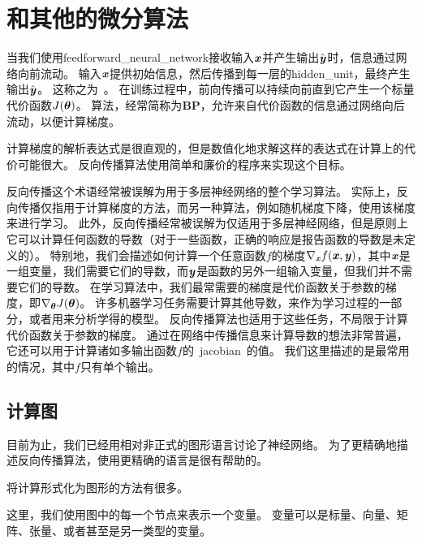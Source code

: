 
\section{和其他的微分算法}
\label{sec:back_propagation_and_other_differentiation_algorithms}

当我们使用\gls{feedforward_neural_network}接收输入$\boldsymbol{\mathit{x}}$并产生输出$\hat{\boldsymbol{\mathit{y}}}$时，信息通过网络向前流动。
输入$\boldsymbol{\mathit{x}}$提供初始信息，然后传播到每一层的\gls{hidden_unit}，最终产生输出$\hat{\boldsymbol{\mathit{y}}}$。
这称之为~。
在训练过程中，前向传播可以持续向前直到它产生一个标量代价函数$J(\boldsymbol{\theta})$。
算法\citep{RHW}，经常简称为\textbf{\glsdesc{BP}}，允许来自代价函数的信息通过网络向后流动，以便计算梯度。


计算梯度的解析表达式是很直观的，但是数值化地求解这样的表达式在计算上的代价可能很大。
反向传播算法使用简单和廉价的程序来实现这个目标。

反向传播这个术语经常被误解为用于多层神经网络的整个学习算法。
实际上，反向传播仅指用于计算梯度的方法，而另一种算法，例如随机梯度下降，使用该梯度来进行学习。
此外，反向传播经常被误解为仅适用于多层神经网络，但是原则上它可以计算任何函数的导数（对于一些函数，正确的响应是报告函数的导数是未定义的）。
特别地，我们会描述如何计算一个任意函数$f$的梯度$\nabla_{\boldsymbol{\mathit{x}}} f(\boldsymbol{\mathit{x}}, \boldsymbol{\mathit{y}})$，其中$\boldsymbol{\mathit{x}}$是一组变量，我们需要它们的导数，而$\boldsymbol{\mathit{y}}$是函数的另外一组输入变量，但我们并不需要它们的导数。
在学习算法中，我们最常需要的梯度是代价函数关于参数的梯度，即$\nabla_{\boldsymbol{\theta}} J(\boldsymbol{\theta})$。
许多机器学习任务需要计算其他导数，来作为学习过程的一部分，或者用来分析学得的模型。
反向传播算法也适用于这些任务，不局限于计算代价函数关于参数的梯度。
通过在网络中传播信息来计算导数的想法非常普遍，它还可以用于计算诸如多输出函数$f$的~\gls{jacobian}~的值。
我们这里描述的是最常用的情况，其中$f$只有单个输出。

\subsection{计算图}
\label{sec:computational_graphs}

目前为止，我们已经用相对非正式的图形语言讨论了神经网络。
为了更精确地描述反向传播算法，使用更精确的语言是很有帮助的。

将计算形式化为图形的方法有很多。

这里，我们使用图中的每一个节点来表示一个变量。
变量可以是标量、向量、矩阵、张量、或者甚至是另一类型的变量。

